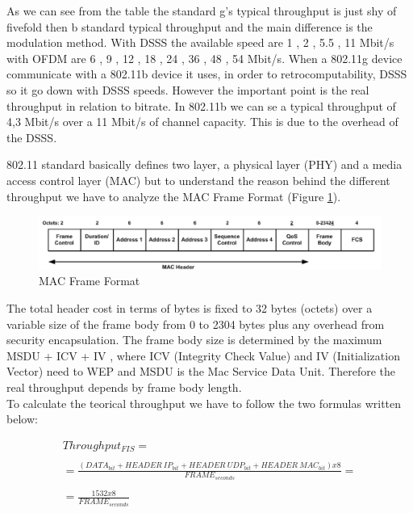 	As we can see from the table the standard g's typical throughput is just shy of fivefold then b standard typical throughput and the main difference is the modulation method.
	With DSSS the available speed are 1 , 2 , 5.5 , 11 Mbit/s with OFDM are 6 , 9 , 12 , 18 , 24 , 36 , 48 , 54 Mbit/s. When a 802.11g device communicate with a 802.11b device it uses, in order to retrocomputability, DSSS  so it go down with DSSS speeds.
	However the important point is the real throughput in relation to bitrate.
	In 802.11b we can se a typical throughput of 4,3 Mbit/s over a 11 Mbit/s of channel capacity. This is due to the overhead of the DSSS.
	
	802.11 standard basically defines two layer, a physical layer (PHY) and a media access control layer (MAC) but to understand the reason behind the different throughput we have to analyze the MAC Frame Format (Figure \ref{mac_packet}).
	
	\begin{figure}[h!]
		\includegraphics[angle=0, keepaspectratio=true, width=15cm]{../images/mac_header2}
		\caption{MAC Frame Format}
		\label{mac_packet}
	\end{figure}
	
	The total header cost in terms of bytes is fixed to 32 bytes (octets) over a variable size of the frame body from 0 to 2304 bytes plus any overhead from security encapsulation. The frame body size is determined by the maximum MSDU + ICV + IV , where ICV (Integrity Check Value) and IV (Initialization Vector) need to WEP and MSDU is the Mac Service Data Unit. Therefore the real throughput depends by frame body length.\\
	
	
	To calculate the teorical throughput we have to follow the two formulas written below:
	
	\begin{gather*}
		Throughput_{FIS} = \\\\
		= \frac{ ( DATA_{bit} + HEADER\ IP_{bit} + HEADER\ UDP_{bit} + HEADER\ MAC_{bit} ) x 8 }{ FRAME_{seconds} } = \\\\
		= \frac{ 1532 x 8 }{  FRAME_{seconds} } \\\\
	\end{gather*}
	
